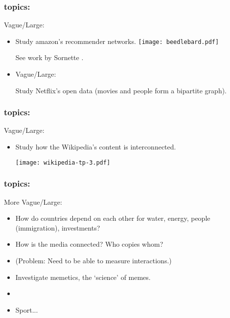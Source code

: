   \begin{frame}
    \frametitle{topics:}

    \begin{block}{Vague/Large:}
      \begin{itemize}
      \item
        Study amazon's recommender
        networks.
        \texttt{[image: beedlebard.pdf]}

        See work by Sornette \etal.
      \item<2->
        Vague/Large:

        Study Netflix's open data
        (movies and people form a bipartite graph).
      \end{itemize}
    \end{block}


\end{frame}


\begin{frame}
  \frametitle{topics:}

  \begin{block}{Vague/Large:}
  \begin{itemize}
  \item
    Study how the Wikipedia's
    content is interconnected.

    \bigskip
    \texttt{[image: wikipedia-tp-3.pdf]}
  \end{itemize}
  \end{block}

\end{frame}



\begin{frame}
  \frametitle{topics:}

  \begin{block}{More Vague/Large:}
    \begin{itemize}
    \item<1->
      How do countries depend on
      each other for water, energy, people (immigration), investments?
    \item<2->
      How is the media connected?
      Who copies whom?
    \item<3->
      (Problem: Need to be able to measure interactions.)
    \item<4->
      Investigate memetics, the `science' of memes.
    \item<5-> 
    \item<6->
      Sport...
    \end{itemize}
  \end{block}

\end{frame}

